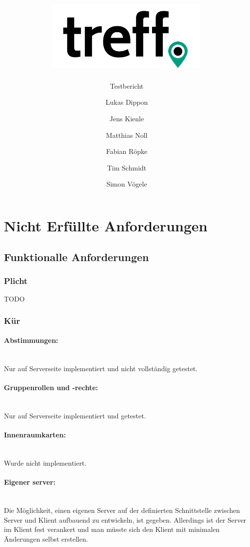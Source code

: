 \documentclass[parskip=full,11pt]{scrartcl}
\title{\includegraphics[width = 80mm]{images/logo_crop.png}}
\subtitle{\huge Testbericht}
\author{Lukas Dippon
        \and Jens Kienle
        \and Matthias Noll
        \and Fabian Röpke
        \and Tim Schmidt
        \and Simon Vögele}
\begin{document}
\maketitle
\thispagestyle{empty} %

\pagebreak
\tableofcontents

\pagebreak
\section{Nicht Erfüllte Anforderungen}
\subsection{Funktionalle Anforderungen}
\subsubsection{Plicht}
TODO
\subsubsection{Kür}
\paragraph{\small Abstimmungen:} \hspace{0pt} \\
Nur auf Serverseite implementiert und nicht vollständig getestet.

\paragraph{\small Gruppenrollen und -rechte:} \hspace{0pt} \\
Nur auf Serverseite implementiert und getestet.

\paragraph{\small Innenraumkarten:} \hspace{0pt} \\
Wurde nicht implementiert.

\paragraph{\small Eigener server:} \hspace{0pt} \\
Die Möglichkeit, einen eigenen Server auf der definierten Schnittstelle zwischen
Server und Klient aufbauend zu entwickeln, ist gegeben. Allerdings ist der
Server im Klient fest verankert und man müsste sich den Klient mit minimalen
Änderungen selbst erstellen.
\end{document}
